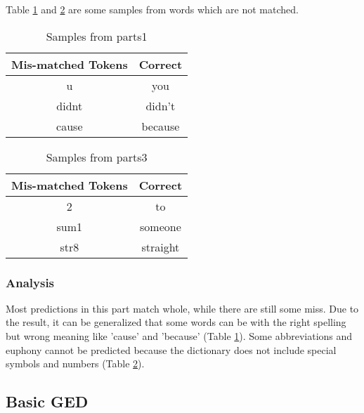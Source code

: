 \documentclass[11pt]{article}
\begin{document}
Table \ref{table_4} and \ref{table_5} are some samples from words which are not matched.\\
\begin{table}[h]
    \begin{center}
        \begin{tabular}{|c|c|}
            \hline
            Mis-matched Tokens & Correct \\ \hline
            u & you \\ \hline
            didnt & didn't \\ \hline
            cause & because \\ \hline
        \end{tabular}
        \caption{Samples from parts1}\label{table_4}
    \end{center}
\end{table}
\begin{table}[h]
    \begin{center}
        \begin{tabular}{|c|c|}
            \hline
            Mis-matched Tokens & Correct \\ \hline
            2 & to \\ \hline
            sum1 & someone \\ \hline
            str8 & straight \\ \hline
        \end{tabular}
        \caption{Samples from parts3}\label{table_5}
    \end{center}
\end{table}

\subsubsection{Analysis}
Most predictions in this part match whole, while there are still some miss. Due to the result, it can be generalized that some words can be with the right spelling but wrong meaning like 'cause' and 'because' (Table \ref{table_4}). Some abbreviations and euphony cannot be predicted because the dictionary does not include special symbols and numbers (Table \ref{table_5}).
\subsection{Basic GED}
\end{document}
